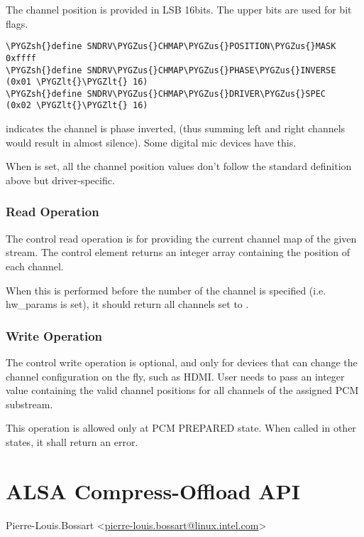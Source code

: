 \documentclass[a4paper,8pt,english]{sphinxmanual}
\def\PYGZus{\char`\_}
\def\PYGZlt{\char`\<}
\def\PYGZsh{\char`\#}
\begin{document}
The channel position is provided in LSB 16bits.  The upper bits are
used for bit flags.

\begin{Verbatim}[commandchars=\\\{\}]
\PYGZsh{}define SNDRV\PYGZus{}CHMAP\PYGZus{}POSITION\PYGZus{}MASK       0xffff
\PYGZsh{}define SNDRV\PYGZus{}CHMAP\PYGZus{}PHASE\PYGZus{}INVERSE       (0x01 \PYGZlt{}\PYGZlt{} 16)
\PYGZsh{}define SNDRV\PYGZus{}CHMAP\PYGZus{}DRIVER\PYGZus{}SPEC         (0x02 \PYGZlt{}\PYGZlt{} 16)
\end{Verbatim}

 indicates the channel is phase inverted,
(thus summing left and right channels would result in almost silence).
Some digital mic devices have this.

When  is set, all the channel position values
don't follow the standard definition above but driver-specific.


\subsubsection{Read Operation}
\label{sound/designs/channel-mapping-api:read-operation}
The control read operation is for providing the current channel map of
the given stream.  The control element returns an integer array
containing the position of each channel.

When this is performed before the number of the channel is specified
(i.e. hw\_params is set), it should return all channels set to
.


\subsubsection{Write Operation}
\label{sound/designs/channel-mapping-api:write-operation}
The control write operation is optional, and only for devices that can
change the channel configuration on the fly, such as HDMI.  User needs
to pass an integer value containing the valid channel positions for
all channels of the assigned PCM substream.

This operation is allowed only at PCM PREPARED state.  When called in
other states, it shall return an error.


\section{ALSA Compress-Offload API}
\label{sound/designs/compress-offload::doc}\label{sound/designs/compress-offload:alsa-compress-offload-api}
Pierre-Louis.Bossart \textless{}\href{mailto:pierre-louis.bossart@linux.intel.com}{pierre-louis.bossart@linux.intel.com}\textgreater{}
\end{document}
